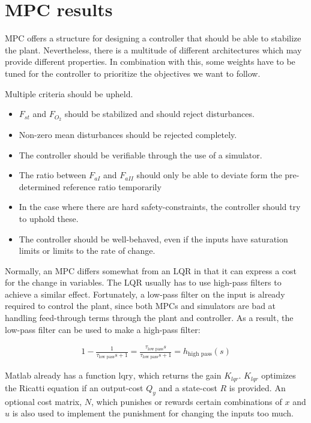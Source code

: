 \section{MPC results}
\label{sec:MPC_results}
MPC offers a structure for designing a controller that should be able to stabilize the plant. Nevertheless, there is a multitude of different architectures which may provide different properties. In combination with this, some weights have to be tuned for the controller to prioritize the objectives we want to follow. 

\noindent
Multiple criteria should be upheld.
\begin{itemize}
    \item $F_{st}$ and $F_{O_2}$ should be stabilized and should reject disturbances.
    \item Non-zero mean disturbances should be rejected completely.
    \item The controller should be verifiable through the use of a simulator. 
    \item The ratio between $F_{aI}$ and $F_{aII}$ should only be able to deviate form the pre-determined reference ratio temporarily
    \item In the case where there are hard safety-constraints, the controller should try to uphold these. 
    \item The controller should be well-behaved, even if the inputs have saturation limits or limits to the rate of change. 
\end{itemize}

\noindent 
Normally, an MPC differs somewhat from an LQR in that it can express a cost for the change in variables. The LQR usually has to use high-pass filters to achieve a similar effect. Fortunately, a low-pass filter on the input is already required to control the plant, since both MPCs and simulators are bad at handling feed-through terms through the plant and controller. As a result, the low-pass filter can be used to make a high-pass filter:

\begin{align}
   1 - \frac{1}{\tau_{\text{low pass}} s +1} = \frac{\tau_{\text{low pass}}s}{\tau_{\text{low pass}}s +1} = h_{\text{high pass}}(s)
\end{align}

\noindent
Matlab already has a function $\text{lqry}$, which returns the gain $K_{lqr}$. $K_{lqr}$  optimizes the Ricatti equation if an output-cost $Q_y$ and a state-cost $R$ is provided. An optional cost matrix, $N$, which punishes or rewards certain combinations of $x$ and $u$ is also used to implement the punishment for changing the inputs too much.


